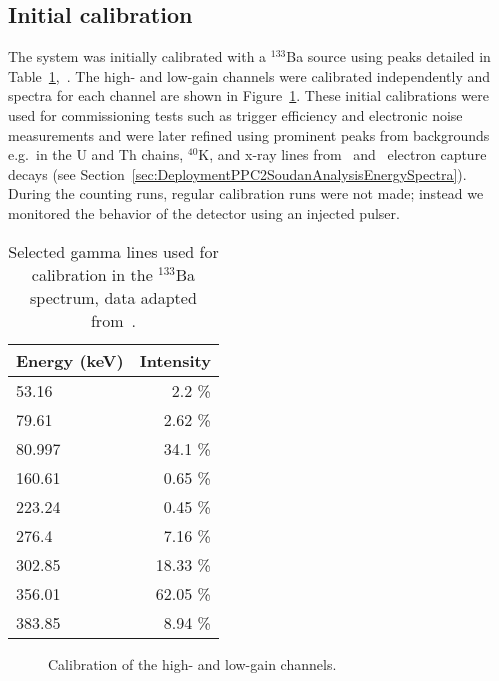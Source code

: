 		\subsection{Initial calibration}
		\label{sec:DeploymentPPC2SoudanAnalysisCalibration}    
			
	The system was initially calibrated with a $^{133}$Ba source using peaks detailed in Table~\ref{tab:Ba133Peaks},~\cite{Rab1995491}.  The high- and low-gain channels were calibrated independently and spectra for each channel are shown in Figure~\ref{fig:PPC2Calibration}.  These initial calibrations were used for commissioning tests such as trigger efficiency and electronic noise measurements and were later refined using prominent peaks from backgrounds e.g.~in the U and Th chains, $^{40}$K, and x-ray lines from \gersixeight~and \znsixfive~electron capture decays (see Section~\ref{sec:DeploymentPPC2SoudanAnalysisEnergySpectra}).  During the counting runs, regular calibration runs were not made; instead we monitored the behavior of the detector using an injected pulser.  

				\begin{table}
					\centering
					\begin{tabular}{l|r}
						Energy (keV) & Intensity \\
						\hline
						    53.16 	 &     2.2 \% \\ 
						    79.61 	 &     2.62 \% \\
						    80.997 	 &    34.1 \%\\
						   160.61 	 &     0.65 \%\\
						   223.24 	 &   0.45 \% \\
						   276.4 	 &     7.16 \% \\
						   302.85 	 &   18.33 \% \\
						   356.01 	 &    62.05 \% \\
						   383.85 	  &    8.94 \% \\
						\hline
					\end{tabular}
					\caption[Selected gamma lines used for calibration in the $^{133}$Ba spectrum]
					{Selected gamma lines used for calibration in the $^{133}$Ba spectrum, 
					data adapted from~\cite{Rab1995491}.}
					\label{tab:Ba133Peaks}
				\end{table}	
						
				\begin{figure}
					\centering
					\caption[Calibration of the high- and low-gain channels]
					{Calibration of the high- and low-gain channels.}
					\label{fig:PPC2Calibration}
				\end{figure}

